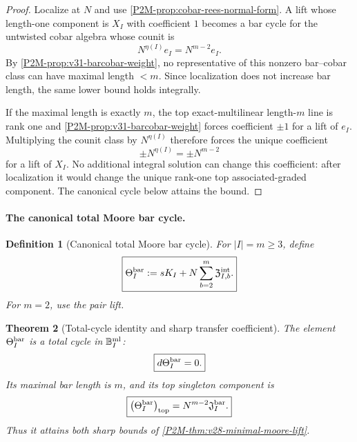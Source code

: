 \documentclass[11pt]{article}
\newtheorem{theorem}{Theorem}[section]
\newtheorem{definition}[theorem]{Definition}
\theoremstyle{remark}
\begin{document}
\begin{proof}
Localize at \(N\) and use
\cref{P2M-prop:cobar-rees-normal-form}.  A lift whose length-one component is
\(X_I\) with coefficient \(1\) becomes a bar cycle for the untwisted cobar
algebra whose counit is
\[
 N^{\eta(I)}e_I=N^{m-2}e_I.
\]
By \cref{P2M-prop:v31-barcobar-weight}, no representative of this nonzero
bar--cobar class can have maximal length \(<m\).  Since localization does not
increase bar length, the same lower bound holds integrally.

If the maximal length is exactly \(m\), the top exact-multilinear length-\(m\)
line is rank one and \cref{P2M-prop:v31-barcobar-weight} forces coefficient
\(\pm1\) for a lift of \(e_I\).  Multiplying the counit class by
\(N^{\eta(I)}\) therefore forces the unique coefficient
\[
 \pm N^{\eta(I)}
 =
 \pm N^{m-2}
\]
for a lift of \(X_I\).  No additional integral solution can change this
coefficient: after localization it would change the unique rank-one top
associated-graded component.  The canonical cycle below attains the bound.
\end{proof}

\paragraph{The canonical total Moore bar cycle.}


\begin{definition}[Canonical total Moore bar cycle]
\label{P2M-def:v28-total-moore-bar-cycle}
For \(|I|=m\ge3\), define
\begin{equation}
 \boxed{
 \Theta_I^{\rm bar}
 :=
 sK_I
 +
 N\sum_{b=2}^{m}
 \mathfrak Z_{I,b}^{\rm int}.}
\end{equation}
For \(m=2\), use the pair lift.
\end{definition}

\begin{theorem}[Total-cycle identity and sharp transfer coefficient]
\label{P2M-thm:v28-total-moore-cycle}
The element \(\Theta_I^{\rm bar}\) is a total cycle in
\(\mathbb B_I^{\rm ml}\):
\begin{equation}
 \boxed{d\Theta_I^{\rm bar}=0.}
\end{equation}
Its maximal bar length is \(m\), and its top singleton component is
\begin{equation}
 \boxed{
 \left(\Theta_I^{\rm bar}\right)_{\rm top}
 =
 N^{m-2}\mathfrak J_I^{\rm bar}.}
\end{equation}
Thus it attains both sharp bounds of
\cref{P2M-thm:v28-minimal-moore-lift}.
\end{theorem}
\end{document}
